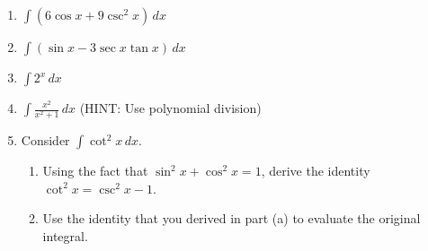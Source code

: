 \documentclass[12pt]{article}
\newif\ifans
\begin{document}
\begin{enumerate}
\ifans{\fbox{$\frac{1}{2}\sin^{-1}{x}+C$; Detailed Solution: \textcolor{blue}{\href{http://www.math.drexel.edu/classes/Calculus/resources/Math122HW/Solutions/122_03_Antiderivatives_14.pdf}{Here}}}} \fi

\item $\int \left(6\cos{x}+9\csc^{2}{x}\right) \,dx$ 

\ifans{\fbox{$6\sin{x}-9\cot{x}+C$}} \fi

\item $\int \left(\sin{x}-3\sec{x}\tan{x}\right) \,dx$ 

\ifans{\fbox{$-\cos{x}-3\sec{x}+C$}} \fi

\item $\int 2^{x} \,dx$ 

\ifans{\fbox{$\frac{2^{x}}{\ln{2}}+C$}} \fi

\item $\int \frac{x^2}{x^2+1} \,dx$ (HINT: Use polynomial division)

\ifans{\fbox{$x-\arctan{x}+C$; Video Solution: \textcolor{blue}{\href{https://www.youtube.com/watch?v=kTLkMO8l2Ak}{https://www.youtube.com/watch?v=kTLkMO8l2Ak}}}} \fi

\item Consider $\int{\cot^{2}{x}} \,dx$.

\begin{enumerate}

\item Using the fact that $\sin^{2}{x}+\cos^{2}{x}=1$, derive the identity $\cot^2{x}=\csc^{2}{x}-1$.

\ifans{\fbox{\parbox{1\linewidth}{ Provided that $x \neq \pi \cdot k$, where $k$ is any integer, we have:
\begin{align*} 
\sin^{2}{x}+\cos^{2}{x} &=1\\
\frac{\sin^{2}{x}}{\sin^{2}{x}}+\frac{\cos^{2}{x}}{\sin^2{x}}&=\frac{1}{\sin^2{x}}\\
1+\cot^2{x}&=\csc^2{x}\\
\cot^2{x}&=\csc^2{x}-1
\end{align*}
}}} \fi

\item Use the identity that you derived in part (a) to evaluate the original integral.

\ifans{\fbox{$\int{\cot^{2}{x}} \,dx=-\cot{x}-x+C$.}} \fi

\end{enumerate}

\end{enumerate}
\end{document}
